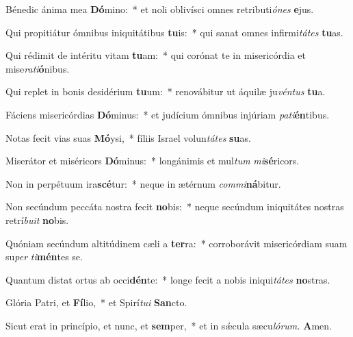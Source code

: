 \item Bénedic ánima mea \textbf{Dó}mino:~* et noli oblivísci omnes retributi\tinyhspace\textit{ónes} \textbf{e}jus.
\item Qui propitiátur ómnibus iniquitátibus \textbf{tu}is:~* qui sanat omnes infirmi\tinyhspace\textit{tátes} \textbf{tu}as.
\item Qui rédimit de intéritu vitam \textbf{tu}am:~* qui corónat te in misericórdia et mise\tinyhspace\textit{rati}\textbf{ó}nibus.
\item Qui replet in bonis desidérium \textbf{tu}um:~* renovábitur ut áquilæ ju\textit{véntus} \textbf{tu}a.
\item Fáciens misericórdias \textbf{Dó}minus:~* et judícium ómnibus injúriam \textit{pati}\textbf{én}tibus.
\item Notas fecit vias suas \textbf{Mó}ysi,~* fíliis Israel volun\tinyhspace\textit{tátes} \textbf{su}as.
\item Miserátor et miséricors \textbf{Dó}minus:~* longánimis et mul\textit{tum} \textit{mi}\textbf{sé}ricors.
\item Non in perpétuum ira\textbf{scé}tur:~* neque in ætérnum \textit{commi}\textbf{ná}bitur.
\item Non secúndum peccáta nostra fecit \textbf{no}bis:~* neque secúndum iniquitátes nostras retrí\textit{buit} \textbf{no}bis.
\item Quóniam secúndum altitúdinem cæli a \textbf{ter}ra:~* corroborávit misericórdiam suam su\textit{per} \textit{ti}\textbf{mén}tes se.
\item Quantum distat ortus ab occi\textbf{dén}te:~* longe fecit a nobis iniqui\textit{tátes} \textbf{no}stras.
\item Glória Patri, et \textbf{Fí}lio,~* et Spirí\tinyhspace\textit{tui} \textbf{San}cto.
\item Sicut erat in princípio, et nunc, et \textbf{sem}per,~* et in sǽcula sæcu\tinyhspace\textit{lórum.} \textbf{A}men.
